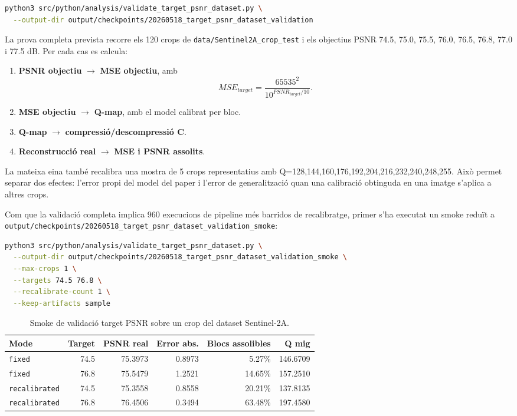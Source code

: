 \documentclass[11pt,a4paper]{article}
\begin{document}
\begin{lstlisting}[language=bash]
python3 src/python/analysis/validate_target_psnr_dataset.py \
  --output-dir output/checkpoints/20260518_target_psnr_dataset_validation
\end{lstlisting}

La prova completa prevista recorre els 120 crops de \texttt{data/Sentinel2A\_crop\_test} i els objectius PSNR 74.5, 75.0, 75.5, 76.0, 76.5, 76.8, 77.0 i 77.5 dB. Per cada cas es calcula:
\begin{enumerate}
  \item \textbf{PSNR objectiu} $\rightarrow$ \textbf{MSE objectiu}, amb
  \begin{equation}
    MSE_{target} = \frac{65535^2}{10^{PSNR_{target}/10}}.
  \end{equation}
  \item \textbf{MSE objectiu} $\rightarrow$ \textbf{Q-map}, amb el model calibrat per bloc.
  \item \textbf{Q-map} $\rightarrow$ \textbf{compressió/descompressió C}.
  \item \textbf{Reconstrucció real} $\rightarrow$ \textbf{MSE i PSNR assolits}.
\end{enumerate}

La mateixa eina també recalibra una mostra de 5 crops representatius amb Q=128,144,160,176,192,204,216,232,240,248,255. Això permet separar dos efectes: l'error propi del model del paper i l'error de generalització quan una calibració obtinguda en una imatge s'aplica a altres crops.

Com que la validació completa implica 960 execucions de pipeline més barridos de recalibratge, primer s'ha executat un smoke reduït a \texttt{output/checkpoints/20260518\_target\_psnr\_dataset\_validation\_smoke}:

\begin{lstlisting}[language=bash]
python3 src/python/analysis/validate_target_psnr_dataset.py \
  --output-dir output/checkpoints/20260518_target_psnr_dataset_validation_smoke \
  --max-crops 1 \
  --targets 74.5 76.8 \
  --recalibrate-count 1 \
  --keep-artifacts sample
\end{lstlisting}

\begin{table}[H]
\centering
\begin{tabular}{lrrrrr}
\toprule
\textbf{Mode} & \textbf{Target} & \textbf{PSNR real} & \textbf{Error abs.} & \textbf{Blocs assolibles} & \textbf{Q mig} \\
\midrule
\texttt{fixed} & 74.5 & 75.3973 & 0.8973 & 5.27\% & 146.6709 \\
\texttt{fixed} & 76.8 & 75.5479 & 1.2521 & 14.65\% & 157.2510 \\
\texttt{recalibrated} & 74.5 & 75.3558 & 0.8558 & 20.21\% & 137.8135 \\
\texttt{recalibrated} & 76.8 & 76.4506 & 0.3494 & 63.48\% & 197.4580 \\
\bottomrule
\end{tabular}
\caption{Smoke de validació target PSNR sobre un crop del dataset Sentinel-2A.}
\end{table}
\end{document}
